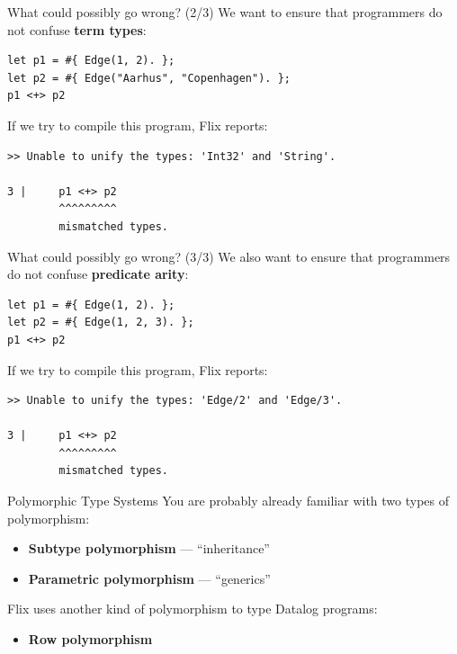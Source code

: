 \begin{frame}[fragile]{What could possibly go wrong? (2/3)}
We want to ensure that programmers do not confuse \textbf{term types}:

\begin{lstlisting}[language=flix, xleftmargin=0.8cm]
let p1 = #{ Edge(1, 2). };
let p2 = #{ Edge("Aarhus", "Copenhagen"). };
p1 <+> p2
\end{lstlisting}

\pause

If we try to compile this program, Flix reports:

\begin{lstlisting}[language=flix, xleftmargin=0.8cm]
>> Unable to unify the types: 'Int32' and 'String'.

3 |     p1 <+> p2
        ^^^^^^^^^
        mismatched types.
\end{lstlisting}
\end{frame}

\begin{frame}[fragile]{What could possibly go wrong? (3/3)}
We also want to ensure that programmers do not confuse \textbf{predicate arity}:

\begin{lstlisting}[language=flix, xleftmargin=0.8cm]
let p1 = #{ Edge(1, 2). };
let p2 = #{ Edge(1, 2, 3). };
p1 <+> p2
\end{lstlisting}

\pause

If we try to compile this program, Flix reports:

\begin{lstlisting}[language=flix, xleftmargin=0.8cm]
>> Unable to unify the types: 'Edge/2' and 'Edge/3'.

3 |     p1 <+> p2
        ^^^^^^^^^
        mismatched types.
\end{lstlisting}
\end{frame}

\begin{frame}{Polymorphic Type Systems}
You are probably already familiar with two types of polymorphism:

\begin{itemize}
    \item \textbf{Subtype polymorphism} --- ``inheritance''
    \item \textbf{Parametric polymorphism} --- ``generics''
\end{itemize}

\pause

Flix uses another kind of polymorphism to type Datalog programs:

\begin{itemize}
    \item \textbf{Row polymorphism}
\end{itemize}
\end{frame}

